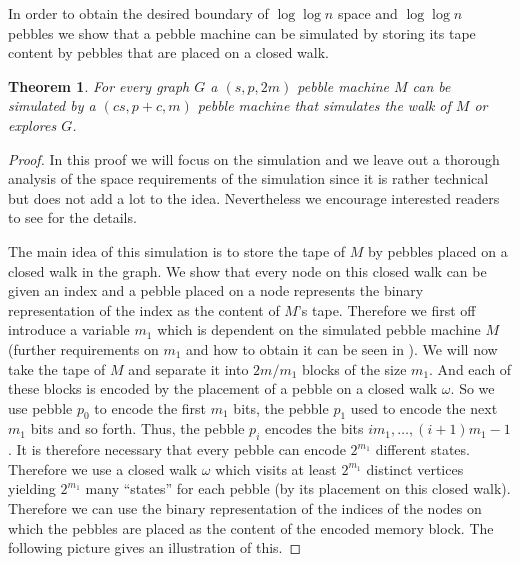 \documentclass[draft,oneside]{scrartcl}
\newtheorem{thm}{Theorem}
\begin{document}
In order to obtain the desired boundary of $\log\log n$ space and $\log\log n$
pebbles we show that a pebble machine can be simulated by storing its tape
content by pebbles that are placed on a closed walk.
\begin{thm}
  \label{thm:simulation}
  For every graph $G$ a $(s,p,2m)$ pebble machine $M$ can be simulated by
  a $(cs,p + c,m)$ pebble machine that simulates the walk of $M$ or explores
  $G$.
\end{thm}
\begin{proof}
  In this proof we will focus on the simulation and we leave out a thorough
  analysis of the space requirements of the simulation since it is rather
  technical but does not add a lot to the idea. Nevertheless we encourage
  interested readers to see \cite{pebbles} for the details.

  The main idea of this simulation is to store the tape of $M$ by pebbles
  placed on a closed walk in the graph. We show that every node on this closed
  walk can be given an index and a pebble placed on a node represents the
  binary representation of the index as the content of $M$'s tape. Therefore we
  first off introduce a variable $m_{1}$ which is dependent on the simulated
  pebble machine $M$ (further requirements on $m_{1}$ and how to obtain it
  can be seen in \cite{pebbles}). We will now take the tape of $M$ and separate
  it into $2m/m_{1}$ blocks of the size $m_{1}$. And each of these blocks is
  encoded by the placement of a pebble on a closed walk $\omega$. So we use
  pebble $p_{0}$ to encode the first $m_{1}$ bits, the pebble $p_{1}$ used to
  encode the next $m_{1}$ bits and so forth. Thus, the pebble $p_{i}$ encodes
  the bits $im_{1},\dots,(i+1)m_{1}-1$. It is therefore necessary that every
  pebble can encode $2^{m_1}$ different states. Therefore we use a closed walk
  $\omega$ which visits at least $2^{m_1}$ distinct vertices yielding $2^{m_1}$
  many \enquote{states} for each pebble (by its placement on this closed walk).
  Therefore we can use the binary representation of the indices of the nodes
  on which the pebbles are placed as the content of the encoded memory block.
  The following picture gives an illustration of this.


\end{proof}
\end{document}
